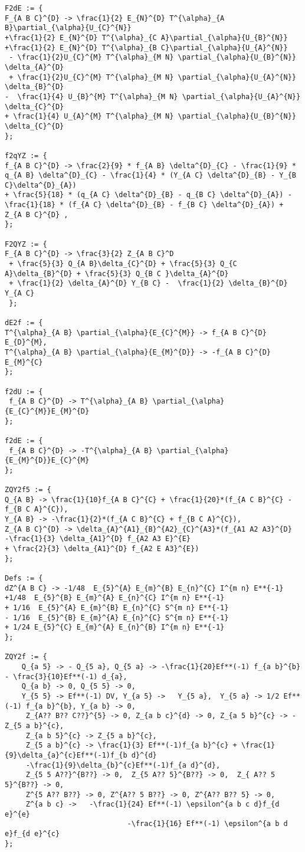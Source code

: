 \documentclass[11pt]{article}
\begin{document}
{\begin{verbatim}
F2dE := {
F_{A B C}^{D} -> \frac{1}{2} E_{N}^{D} T^{\alpha}_{A B}\partial_{\alpha}{U_{C}^{N}}
+\frac{1}{2} E_{N}^{D} T^{\alpha}_{C A}\partial_{\alpha}{U_{B}^{N}}
+\frac{1}{2} E_{N}^{D} T^{\alpha}_{B C}\partial_{\alpha}{U_{A}^{N}}
 - \frac{1}{2}U_{C}^{M} T^{\alpha}_{M N} \partial_{\alpha}{U_{B}^{N}} \delta_{A}^{D}
 + \frac{1}{2}U_{C}^{M} T^{\alpha}_{M N} \partial_{\alpha}{U_{A}^{N}} \delta_{B}^{D}
-  \frac{1}{4} U_{B}^{M} T^{\alpha}_{M N} \partial_{\alpha}{U_{A}^{N}} \delta_{C}^{D}
+ \frac{1}{4} U_{A}^{M} T^{\alpha}_{M N} \partial_{\alpha}{U_{B}^{N}} \delta_{C}^{D}
};

f2qYZ := {
f_{A B C}^{D} -> \frac{2}{9} * f_{A B} \delta^{D}_{C} - \frac{1}{9} * q_{A B} \delta^{D}_{C} - \frac{1}{4} * (Y_{A C} \delta^{D}_{B} - Y_{B C}\delta^{D}_{A})
+ \frac{5}{18} * (q_{A C} \delta^{D}_{B} - q_{B C} \delta^{D}_{A}) - \frac{1}{18} * (f_{A C} \delta^{D}_{B} - f_{B C} \delta^{D}_{A}) + Z_{A B C}^{D} ,
};

F2QYZ := {
F_{A B C}^{D} -> \frac{3}{2} Z_{A B C}^D  
 + \frac{5}{3} Q_{A B}\delta_{C}^{D} + \frac{5}{3} Q_{C A}\delta_{B}^{D} + \frac{5}{3} Q_{B C }\delta_{A}^{D} 
 + \frac{1}{2} \delta_{A}^{D} Y_{B C} -  \frac{1}{2} \delta_{B}^{D} Y_{A C}
 };

dE2f := {
T^{\alpha}_{A B} \partial_{\alpha}{E_{C}^{M}} -> f_{A B C}^{D} E_{D}^{M},
T^{\alpha}_{A B} \partial_{\alpha}{E_{M}^{D}} -> -f_{A B C}^{D} E_{M}^{C}
};

f2dU := {
 f_{A B C}^{D} -> T^{\alpha}_{A B} \partial_{\alpha}{E_{C}^{M}}E_{M}^{D}
};

f2dE := {
 f_{A B C}^{D} -> -T^{\alpha}_{A B} \partial_{\alpha}{E_{M}^{D}}E_{C}^{M}
};

ZQY2f5 := {
Q_{A B} -> \frac{1}{10}f_{A B C}^{C} + \frac{1}{20}*(f_{A C B}^{C} - f_{B C A}^{C}),
Y_{A B} -> -\frac{1}{2}*(f_{A C B}^{C} + f_{B C A}^{C}),
Z_{A B C}^{D} -> \delta_{A}^{A1}_{B}^{A2}_{C}^{A3}*(f_{A1 A2 A3}^{D}  -\frac{1}{3} \delta_{A1}^{D} f_{A2 A3 E}^{E} 
+ \frac{2}{3} \delta_{A1}^{D} f_{A2 E A3}^{E})
};

Defs := {
dZ^{A B C} -> -1/48  E_{5}^{A} E_{m}^{B} E_{n}^{C} I^{m n} E**{-1} 
+1/48  E_{5}^{B} E_{m}^{A} E_{n}^{C} I^{m n} E**{-1} 
+ 1/16  E_{5}^{A} E_{m}^{B} E_{n}^{C} S^{m n} E**{-1} 
- 1/16  E_{5}^{B} E_{m}^{A} E_{n}^{C} S^{m n} E**{-1}
+ 1/24 E_{5}^{C} E_{m}^{A} E_{n}^{B} I^{m n} E**{-1}
};

ZQY2f := {
    Q_{a 5} -> - Q_{5 a}, Q_{5 a} -> -\frac{1}{20}Ef**(-1) f_{a b}^{b} - \frac{3}{10}Ef**(-1) d_{a},
    Q_{a b} -> 0, Q_{5 5} -> 0,
    Y_{5 5} -> Ef**(-1) DV, Y_{a 5} ->   Y_{5 a},  Y_{5 a} -> 1/2 Ef**(-1) f_{a b}^{b}, Y_{a b} -> 0,
     Z_{A?? B?? C??}^{5} -> 0, Z_{a b c}^{d} -> 0, Z_{a 5 b}^{c} -> - Z_{5 a b}^{c},
     Z_{a b 5}^{c} -> Z_{5 a b}^{c}, 
     Z_{5 a b}^{c} -> \frac{1}{3} Ef**(-1)f_{a b}^{c} + \frac{1}{9}\delta_{a}^{c}Ef**(-1)f_{b d}^{d}
     -\frac{1}{9}\delta_{b}^{c}Ef**(-1)f_{a d}^{d},
     Z_{5 5 A??}^{B??} -> 0,  Z_{5 A?? 5}^{B??} -> 0,  Z_{ A?? 5 5}^{B??} -> 0,  
     Z^{5 A?? B??} -> 0, Z^{A?? 5 B??} -> 0, Z^{A?? B?? 5} -> 0,
     Z^{a b c} ->   -\frac{1}{24} Ef**(-1) \epsilon^{a b c d}f_{d e}^{e}
                             -\frac{1}{16} Ef**(-1) \epsilon^{a b d e}f_{d e}^{c}
};


\end{verbatim}}
\end{document}
